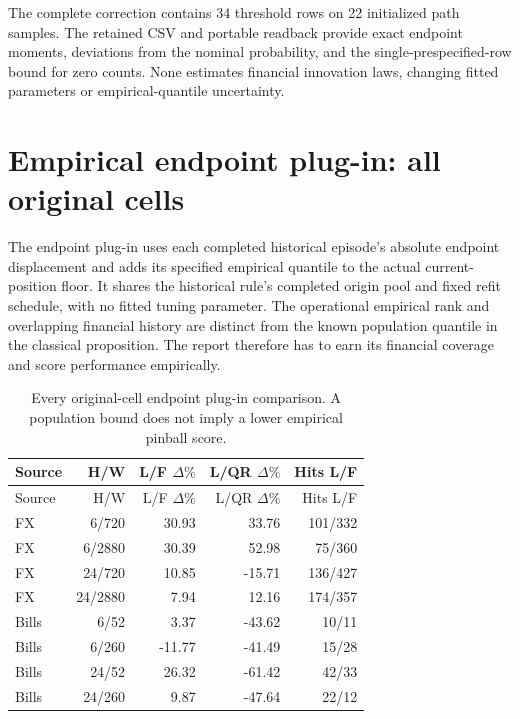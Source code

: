 \documentclass[11pt,a4paper]{article}
\begin{document}
The complete correction contains 34 threshold rows on 22 initialized path samples.
The retained CSV and portable readback provide exact endpoint moments,
deviations from the nominal probability, and the single-prespecified-row bound
for zero counts. None estimates financial innovation laws, changing fitted
parameters or empirical-quantile uncertainty.\section{Empirical endpoint plug-in: all original cells}\label{sup:levy-empirical}

The endpoint plug-in uses each completed historical episode's
absolute endpoint displacement and adds its specified empirical quantile to
the actual current-position floor. It shares the historical rule's completed
origin pool and fixed refit schedule, with no fitted tuning parameter.
The operational empirical rank and overlapping financial history are distinct
from the known population quantile in the classical proposition. The report
therefore has to earn its financial coverage and score performance empirically.
\begingroup
\small
\setlength{\tabcolsep}{3pt}
\renewcommand{\arraystretch}{1.12}
\begin{longtable}{lrrrr}
\caption{Every original-cell endpoint plug-in comparison. A population bound does not imply a lower empirical pinball score.}\\
\toprule
Source & H/W & L/F \(\Delta\%\) & L/QR \(\Delta\%\) & Hits L/F \\
\midrule
\endfirsthead
\toprule
Source & H/W & L/F \(\Delta\%\) & L/QR \(\Delta\%\) & Hits L/F \\
\midrule
\endhead
\bottomrule
\endfoot
FX & 6/720 & 30.93 & 33.76 & 101/332 \\
FX & 6/2880 & 30.39 & 52.98 & 75/360 \\
FX & 24/720 & 10.85 & -15.71 & 136/427 \\
FX & 24/2880 & 7.94 & 12.16 & 174/357 \\
Bills & 6/52 & 3.37 & -43.62 & 10/11 \\
Bills & 6/260 & -11.77 & -41.49 & 15/28 \\
Bills & 24/52 & 26.32 & -61.42 & 42/33 \\
Bills & 24/260 & 9.87 & -47.64 & 22/12 \\
\end{longtable}
\endgroup
\end{document}
